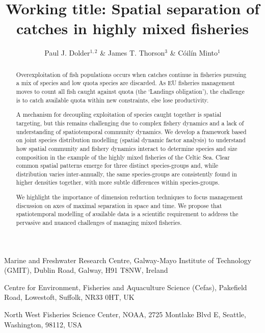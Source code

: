\documentclass{nature}
\title{Working title: Spatial separation of catches in highly mixed fisheries}
\author{Paul J. Dolder$^{1,2}$ \& James T. Thorson$^3$ \& Cóilín Minto$^1$}
\begin{document}
\maketitle

\begin{affiliations}
\item Marine and Freshwater Research Centre, Galway-Mayo Institute of
	Technology (GMIT), Dublin Road, Galway, H91 T8NW, Ireland 
\item Centre for Environment, Fisheries and Aquaculture Science (Cefas),
	Pakefield Road, Lowestoft, Suffolk, NR33 0HT, UK
\item North West Fisheries Science Center, NOAA, 2725 Montlake Blvd E, Seattle,
	Washington, 98112, USA
\end{affiliations}


\begin{abstract} 
Overexploitation of fish populations occurs when catches continue in fisheries
pursuing a mix of species and low quota species are discarded. As EU fisheries
management moves to count all fish caught against quota (the `Landings
obligation'), the challenge is to catch available quota within new constraints,
else lose productivity.  

A mechanism for decoupling exploitation of species caught together is spatial
targeting, but this remains challenging due to complex fishery dynamics and a
lack of understanding of spatiotemporal community dynamics. We develop
a framework based on joint species distribution modelling (spatial dynamic factor
analysis) to understand how spatial community and fishery dynamics interact to
determine species and size composition in the example of the highly mixed
fisheries of the Celtic Sea.  Clear common spatial patterns emerge for three
distinct species-groups and, while distribution varies inter-annually, the same
species-groups are consistently found in higher densities together, with more
subtle differences within species-groups. 

We highlight the importance of dimension reduction techniques to focus
management discussion on axes of maximal separation in space and time. We
propose that spatiotemporal modelling of available data is a scientific
requirement to address the pervasive and nuanced challenges of managing mixed
fisheries.  
\end{abstract}
\end{document}
